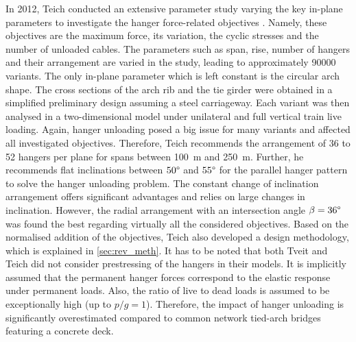 In 2012, Teich conducted an extensive parameter study varying the key in-plane parameters to investigate the hanger force-related objectives \cite{Teich}. Namely, these objectives are the maximum force, its variation, the cyclic stresses and the number of unloaded cables.%
The parameters such as span, rise, number of hangers and their arrangement are varied in the study, leading to approximately \SI{90000}{} variants. The only in-plane parameter which is left constant is the circular arch shape. The cross sections of the arch rib and the tie girder were obtained in a simplified preliminary design assuming a steel carriageway. Each variant was then analysed in a two-dimensional model under unilateral and full vertical train live loading. 
Again, hanger unloading posed a big issue for many variants and affected all investigated objectives. Therefore, Teich recommends the arrangement of 36 to 52 hangers per plane for spans between \SI{100}{m} and \SI{250}{m}. Further, he recommends flat inclinations between $50\degree$ and $55\degree$ for the parallel hanger pattern to solve the hanger unloading problem. The constant change of inclination arrangement offers significant advantages and relies on large changes in inclination. However, the radial arrangement with an intersection angle $\beta=36\degree$ was found the best regarding virtually all the considered objectives. Based on the normalised addition of the objectives, Teich also developed a design methodology, which is explained in \cref{sec:rev_meth}. 
It has to be noted that both Tveit and Teich did not consider prestressing of the hangers in their models. It is implicitly assumed that the permanent hanger forces correspond to the elastic response under permanent loads. Also, the ratio of live to dead loads is assumed to be exceptionally high (up to $p/g=1$). Therefore, the impact of hanger unloading is significantly overestimated compared to common network tied-arch bridges featuring a concrete deck.

